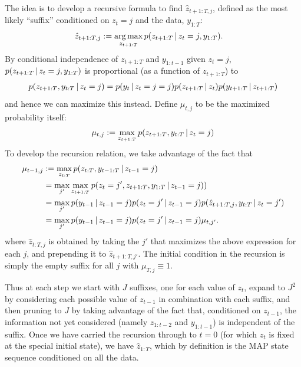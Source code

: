 The idea is to develop
a recursive formula to find
  $\hat{z}_{t+1:T,j}$, defined as the most likely ``suffix''
  conditioned on $z_t = j$ and the data, $y_{1:T}$:
  \begin{align}
    \hat{z}_{t+1:T,j} &:= \operatorname*{arg\,max}_{z_{t+1:T}} p(z_{t+1:T} \, \vert \, z_t =
                        j, y_{1:T}).
  \end{align}
By conditional independence of $z_{t+1:T}$ and $y_{1:t-1}$ given $z_t
= j$, $p(z_{t+1:T} \, \vert \, z_t =
                        j, y_{1:T})$ is proportional (as a function of
                        $z_{t+1:T}$) to
  \begin{align}
    p(z_{t+1:T}, y_{t:T} \, \vert \, z_t = j) =
    p(y_{t} \, \vert \, z_t = j
    = j) p(z_{t+1:T} \, \vert \, z_t) p(y_{t+1:T} \, \vert \, z_{t+1:T})
  \end{align}
  and hence we can maximize this instead.  Define $\mu_{t,j}$ to be the maximized probability itself:
  \begin{align}
    \mu_{t,j} := \max_{z_{t+1:T}} p(z_{t+1:T}, y_{t:T} \, \vert \, z_{t} = j)
  \end{align}
  To develop the recursion relation, we take advantage of the
  fact that
  \begin{align}
    \mu_{t-1,j} &:= \max_{z_{t:T}} p(z_{t:T}, y_{t-1:T} \, \vert \, z_{t-1} = j) \\
    &= \max_{j'} \max_{z_{t+1:T}} p(z_{t} = {j'},
      z_{t+1:T},  y_{1:T}
    \, \vert \, z_{t-1} = j)) \\
    &= \max_{j'} p(y_{t-1} \, \vert \, z_{t-1} = j) p(z_t = j' \, \vert \,
      z_{t-1} = j) p(\hat{z}_{t+1:T,j}, y_{t:T} \, \vert \, z_t = j') \\
    &= \max_{j'} p(y_{t-1} \, \vert \, z_{t-1} = j) p(z_t = j' \, \vert \,
      z_{t-1} = j) \mu_{t,j'}.
  \end{align}
  where $\hat{z}_{t:T,j}$ is obtained by taking the $j'$ that maximizes
  the above expression for each $j$, and prepending it to
  $\hat{z}_{t+1:T,j'}$.  The initial condition in the recursion is
  simply the empty suffix for all $j$ with $\mu_{T,j}
  \equiv 1$.
  
  Thus at each step we start with $J$ suffixes, one for each value of
  $z_t$, expand to $J^2$ by
  considering each possible value of $z_{t-1}$ in combination with
  each suffix, and then pruning to $J$ by taking advantage of the fact
  that, conditioned on $z_{t-1}$, the information not yet considered
  (namely $z_{1:t-2}$ and $y_{1:t-1}$) is independent of the suffix.
  Once we have carried the recursion through to $t = 0$ (for which
  $z_t$ is fixed at the special initial state), we have
  $\hat{z}_{1:T}$, which by definition is the MAP state sequence
  conditioned on all the data.

